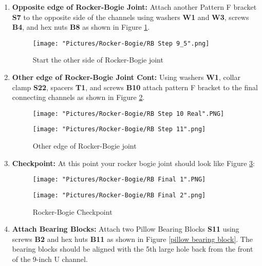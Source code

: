 \documentclass[12pt]{article}
\begin{document}
\begin{enumerate}
\item \textbf{Opposite edge of Rocker-Bogie Joint:} Attach another Pattern F bracket \textbf{S7} to the opposite side of the channels using washers \textbf{W1} and \textbf{W3}, screws \textbf{B4}, and hex nuts \textbf{B8} as shown in Figure \ref{start other edge rocker bogie}. 

\begin{figure}[H]
	\centering
	\texttt{[image: "Pictures/Rocker-Bogie/RB Step 9\_5".png]}
	\caption{Start the other side of Rocker-Bogie joint}
	\label{start other edge rocker bogie}
\end{figure}

\item \textbf{Other edge of Rocker-Bogie Joint Cont: } Using washers \textbf{W1}, collar clamp \textbf{S22},  spacers \textbf{T1}, and screws \textbf{B10} attach pattern F bracket to the final connecting channels as shown in Figure \ref{other edge rocker bogie}. 

\begin{figure}[H]
  \centering
  \begin{minipage}[b]{0.45\textwidth}
    \texttt{[image: "Pictures/Rocker-Bogie/RB Step 10 Real".PNG]}
  \end{minipage}
  \hfill
  \begin{minipage}[b]{0.45\textwidth}
    \texttt{[image: "Pictures/Rocker-Bogie/RB Step 11".png]}
  \end{minipage}
  \caption{Other edge of Rocker-Bogie joint}
  \label{other edge rocker bogie}
\end{figure}

\item \textbf{Checkpoint:} At this point your rocker bogie joint should look like Figure \ref{checkpoint}: 

\begin{figure}[H]
  \centering
  \begin{minipage}[b]{0.45\textwidth}
    \texttt{[image: "Pictures/Rocker-Bogie/RB Final 1".PNG]}
  \end{minipage}
  \hfill
  \begin{minipage}[b]{0.45\textwidth}
    \texttt{[image: "Pictures/Rocker-Bogie/RB Final 2".png]}
  \end{minipage}
  \caption{Rocker-Bogie Checkpoint}
  \label{checkpoint}
\end{figure}

\item \textbf{Attach Bearing Blocks:} Attach two Pillow Bearing Blocks \textbf{S11} using screws \textbf{B2} and hex huts \textbf{B11} as shown in Figure \ref{pillow bearing block}. The bearing blocks should be aligned with the 5th large hole back from the front of the 9-inch U channel. 


\end{enumerate}
\end{document}
